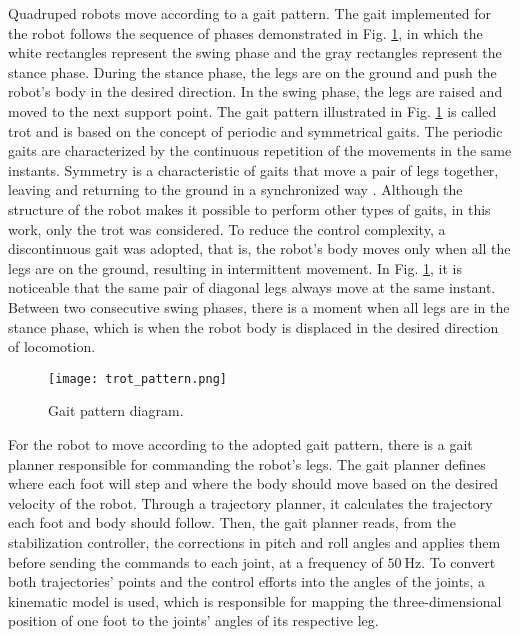 \documentclass[conference]{IEEEtran}
\begin{document}
Quadruped robots move according to a gait pattern. The gait implemented for the robot follows the sequence of phases demonstrated in Fig. \ref{fig:trot_pattern}, in which the white rectangles represent the swing phase and the gray rectangles represent the stance phase. During the stance phase, the legs are on the ground and push the robot's body in the desired direction. In the swing phase, the legs are raised and moved to the next support point. The gait pattern illustrated in Fig. \ref{fig:trot_pattern} is called trot and is based on the concept of periodic and symmetrical gaits. The periodic gaits are characterized by the continuous repetition of the movements in the same instants. Symmetry is a characteristic of gaits that move a pair of legs together, leaving and returning to the ground in a synchronized way \cite{de2006quadrupedal}. Although the structure of the robot makes it possible to perform other types of gaits, in this work, only the trot was considered. To reduce the control complexity, a discontinuous gait was adopted, that is, the robot's body moves only when all the legs are on the ground, resulting in intermittent movement. In Fig. \ref{fig:trot_pattern}, it is noticeable that the same pair of diagonal legs always move at the same instant. Between two consecutive swing phases, there is a moment when all legs are in the stance phase, which is when the robot body is displaced in the desired direction of locomotion.

\begin{figure}[b]
  \vspace{-\baselineskip}
  \centering
  \texttt{[image: trot\_pattern.png]}
  \vfill
  \caption{Gait pattern diagram.}
  \label{fig:trot_pattern}
\end{figure}

For the robot to move according to the adopted gait pattern, there is a gait planner responsible for commanding the robot's legs. The gait planner defines where each foot will step and where the body should move based on the desired velocity of the robot. Through a trajectory planner, it calculates the trajectory each foot and body should follow. Then, the gait planner reads, from the stabilization controller, the corrections in pitch and roll angles and applies them before sending the commands to each joint, at a frequency of $\SI{50}{\hertz}$. To convert both trajectories' points and the control efforts into the angles of the joints, a kinematic model is used, which is responsible for mapping the three-dimensional position of one foot to the joints' angles of its respective leg.
\end{document}
